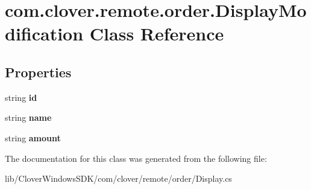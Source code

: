 \hypertarget{classcom_1_1clover_1_1remote_1_1order_1_1_display_modification}{}\section{com.\+clover.\+remote.\+order.\+Display\+Modification Class Reference}
\label{classcom_1_1clover_1_1remote_1_1order_1_1_display_modification}
\subsection*{Properties}
\begin{DoxyCompactItemize}
\item 
\mbox{\label{classcom_1_1clover_1_1remote_1_1order_1_1_display_modification_ad7be756b13262f06dcd46c2fd0dae83a}} 
string {\bfseries id}
\item 
\mbox{\label{classcom_1_1clover_1_1remote_1_1order_1_1_display_modification_a034743d3e96712e47a62dda8b0463b50}} 
string {\bfseries name}
\item 
\mbox{\label{classcom_1_1clover_1_1remote_1_1order_1_1_display_modification_a8c33755b2e3578cd57fc6580f5fb3e6f}} 
string {\bfseries amount}
\end{DoxyCompactItemize}


The documentation for this class was generated from the following file\+:\begin{DoxyCompactItemize}
\item 
lib/\+Clover\+Windows\+S\+D\+K/com/clover/remote/order/Display.\+cs\end{DoxyCompactItemize}
